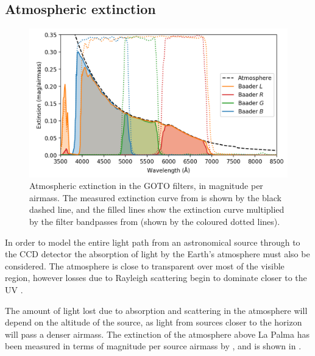 
\subsection{Atmospheric extinction}
\label{sec:atmosphere}
\begin{colsection}

\begin{figure}[t]
    \begin{center}
        \includegraphics[width=\linewidth]{images/throughput/ext2.png}
    \end{center}
    \caption[Atmospheric extinction in the GOTO filters]{
        Atmospheric extinction in the GOTO filters, in magnitude per airmass. The measured extinction curve from \citet{tn31} is shown by the black dashed line, and the filled lines show the extinction curve multiplied by the filter bandpasses from  (shown by the coloured dotted lines).
    }\label{fig:extinction}
\end{figure}

In order to model the entire light path from an astronomical source through to the CCD detector the absorption of light by the Earth's atmosphere must also be considered. The atmosphere is close to transparent over most of the visible region, however losses due to Rayleigh scattering begin to dominate closer to the UV \citep{atmosphere}.

The amount of light lost due to absorption and scattering in the atmosphere will depend on the altitude of the source, as light from sources closer to the horizon will pass a denser airmass. The extinction of the atmosphere above La Palma has been measured in terms of magnitude per source airmass by \citet{tn31}, and is shown in .


\end{colsection}
